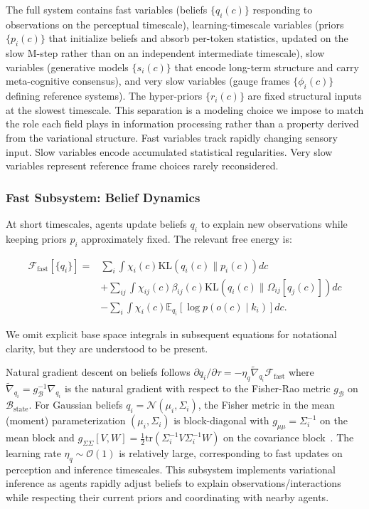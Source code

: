 \documentclass[11pt]{article}
\begin{document}
The full system contains fast variables (beliefs $\{q_i(c)\}$ responding to observations on the perceptual timescale), learning-timescale variables (priors $\{p_i(c)\}$ that initialize beliefs and absorb per-token statistics, updated on the slow M-step rather than on an independent intermediate timescale), slow variables (generative models $\{s_i(c)\}$ that encode long-term structure and carry meta-cognitive consensus), and very slow variables (gauge frames $\{\phi_i(c)\}$ defining reference systems). The hyper-priors $\{r_i(c)\}$ are fixed structural inputs at the slowest timescale. This separation is a modeling choice we impose to match the role each field plays in information processing rather than a property derived from the variational structure. Fast variables track rapidly changing sensory input. Slow variables encode accumulated statistical regularities. Very slow variables represent reference frame choices rarely reconsidered.

\subsubsection{Fast Subsystem: Belief Dynamics}

At short timescales, agents update beliefs $q_i$ to explain new observations while keeping priors $p_i$ approximately fixed. The relevant free energy is:

\begin{align}
\mathcal{F}_{\text{fast}}[\{q_i\}] = {}& \sum_i \int \chi_i(c)  \mathrm{KL}(q_i(c) \| p_i(c))  dc \nonumber\\
&+ \sum_{ij} \int \chi_{ij}(c)  \beta_{ij}(c)  \mathrm{KL}(q_i(c) \| \Omega_{ij}[q_j(c)])  dc \nonumber\\
&- \sum_i \int \chi_i(c)  \mathbb{E}_{q_i}[\log p(o(c) \mid k_i)]  dc.
\end{align}

We omit explicit base space integrals in subsequent equations for notational clarity, but they are understood to be present.

Natural gradient descent on beliefs follows $\partial q_i/\partial \tau = -\eta_q  \tilde{\nabla}_{q_i} \mathcal{F}_{\text{fast}}$ where $\tilde{\nabla}_{q_i} = g_{\mathcal{B}}^{-1} \nabla_{q_i}$ is the natural gradient with respect to the Fisher-Rao metric $g_{\mathcal{B}}$ on $\mathcal{B}_{\mathrm{state}}$. For Gaussian beliefs $q_i = \mathcal{N}(\mu_i, \Sigma_i)$, the Fisher metric in the mean (moment) parameterization $(\mu_i, \Sigma_i)$ is block-diagonal with $g_{\mu\mu} = \Sigma_i^{-1}$ on the mean block and $g_{\Sigma\Sigma}[V, W] = \tfrac{1}{2}\mathrm{tr}(\Sigma_i^{-1} V \Sigma_i^{-1} W)$ on the covariance block~\cite{Amari2016}. The learning rate $\eta_q \sim \mathcal{O}(1)$ is relatively large, corresponding to fast updates on perception and inference timescales. This subsystem implements variational inference as agents rapidly adjust beliefs to explain observations/interactions while respecting their current priors and coordinating with nearby agents.
\end{document}
